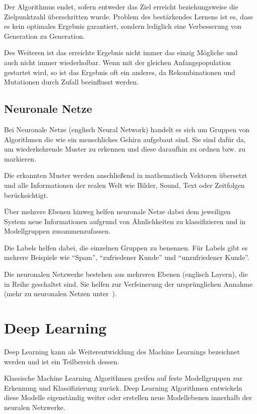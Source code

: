 Der Algorithmus endet, sofern entweder das Ziel erreicht beziehungsweise die Zielpunktzahl überschritten wurde. Problem
des bestärkendes Lernens ist es, dass es kein optimales Ergebnis garantiert, sondern lediglich eine Verbesserung von
Generation zu Generation.

Des Weiteren ist das erreichte Ergebnis nicht immer das einzig Mögliche und auch nicht immer wiederholbar. Wenn mit der
gleichen Anfangspopulation gestartet wird, so ist das Ergebnis oft ein anderes, da Rekombinationen und Mutationen durch
Zufall beeinflusst werden.

\subsection{Neuronale Netze}
Bei Neuronale Netze (englisch Neural Network) handelt es sich um Gruppen von Algorithmen die wie ein menschliches Gehirn
aufgebaut sind. Sie sind dafür da, um wiederkehrende Muster zu erkennen und diese daraufhin zu ordnen bzw. zu markieren.

Die erkannten Muster werden anschließend in mathematisch Vektoren übersetzt und alle Informationen der realen Welt wie
Bilder, Sound, Text oder Zeitfolgen berücksichtigt.

Über mehrere Ebenen hinweg helfen neuronale Netze dabei dem jeweiligen System neue Informationen aufgrund von
Ähnlichkeiten zu klassifizieren und in Modellgruppen zusammenzufassen.

Die Labels helfen dabei, die einzelnen Gruppen zu benennen. Für Labels gibt es mehrere Beispiele wie \enquote{Spam},
\enquote{zufriedener Kunde} und \enquote{unzufriedener Kunde}.

Die neuronalen Netzwerke bestehen aus mehreren Ebenen (englisch Layern), die in Reihe geschaltet sind. Sie helfen zur
Verfeinerung der ursprünglichen Annahme (mehr zu neuronalen Netzen unter~\cite{book_grundlagen_neuronalenetze}).

\section{Deep Learning}
Deep Learning kann als Weiterentwicklung des Machine Learnings bezeichnet werden und ist ein Teilbereich dessen.

Klassische Machine Learning Algorithmen greifen auf feste Modellgruppen zur Erkennung und Klassifizierung zurück. Deep
Learning Algorithmen entwickeln diese Modelle eigenständig weiter oder erstellen neue Modellebenen innerhalb der
neuralen Netzwerke.


